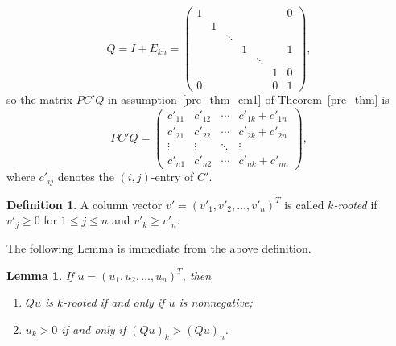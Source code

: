 \documentclass[12pt, a4paper]{article}
\theoremstyle{plain}
\newtheorem{lem}[thm]{Lemma}
\theoremstyle{definition}
\newtheorem{defn}[thm]{Definition}
\begin{document}
\begin{equation} \label{Q_1}
Q=I+E_{kn}=\begin{pmatrix}
1 &   &        &       &        &   & 0 \\
  & 1 &        &       &        &   &   \\
  &   & \ddots &       &        &   &   \\
  &   &        & 1     &        &   & 1 \\
  &   &        &       &\ddots  &   &  \\
  &   &        &       &        &1  & 0 \\
0 &   &        &       &        &0  & 1
\end{pmatrix},
\end{equation}
so the matrix $PC'Q$ in assumption~\ref{pre_thm_em1} of Theorem~\ref{pre_thm} is
\begin{equation}\label{PC'Q}
  PC'Q=\begin{pmatrix}
         c'_{11} & c'_{12} & \cdots &  c'_{1k}+c'_{1n} \\
         c'_{21} & c'_{22} & \cdots &  c'_{2k}+c'_{2n} \\
         \vdots & \vdots & \ddots &  \vdots \\
         c'_{n1} & c'_{n2} & \cdots &  c'_{nk}+c'_{nn}
       \end{pmatrix},
\end{equation}
where $c'_{ij}$ denotes the $(i,j)$-entry of $C'$.






\begin{defn}%
A column vector $v'=(v'_1,v'_2,\ldots,v'_n)^T$ is called {\it $k$-rooted} if $v'_{j} \geq 0$ for $1 \leq  j \leq n$ and $v'_k\geq v'_n$.
\end{defn}

The following Lemma is immediate from the above definition.

\begin{lem}\label{lem:rt_vec}
If $u=(u_1, u_2, \ldots, u_n)^T$, then
\begin{enumerate}[label=(\roman*)]
\item \label{lem:rt_vec:en1} $Qu$ is $k$-rooted  if and only if $u$ is nonnegative;
\item $u_k>0$ if and only if $(Qu)_k>(Qu)_n$.
\end{enumerate}
\end{lem}
\end{document}
